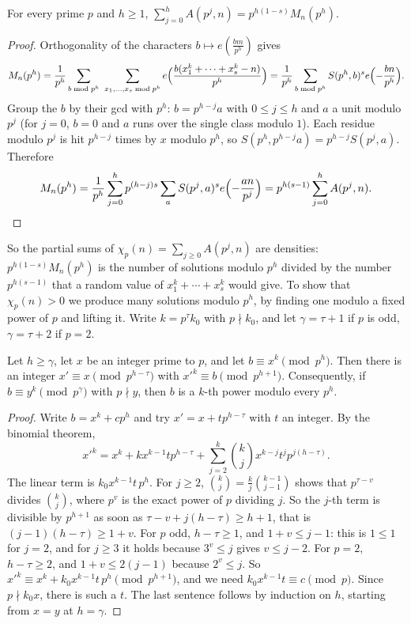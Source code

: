 \begin{lemma}\label{lem:localcount}
For every prime $p$ and $h\ge1$, $\displaystyle\sum_{j=0}^hA(p^j,n)=p^{h(1-s)}M_n(p^h)$.
\end{lemma}
\begin{proof}
Orthogonality of the characters $b\mapsto e(\frac{bm}{p^h})$ gives
\[
M_n(p^h)=\frac1{p^h}\sum_{b\bmod p^h}\ \sum_{x_1,\dots,x_s\bmod p^h}e\Bigl(\frac{b(x_1^k+\cdots+x_s^k-n)}{p^h}\Bigr)=\frac1{p^h}\sum_{b\bmod p^h}S(p^h,b)^se\Bigl(-\frac{bn}{p^h}\Bigr).
\]
Group the $b$ by their gcd with $p^h$: $b=p^{h-j}a$ with $0\le j\le h$ and $a$ a unit modulo $p^j$ (for $j=0$, $b=0$ and $a$ runs over the single class modulo $1$). Each residue modulo $p^j$ is hit $p^{h-j}$ times by $x$ modulo $p^h$, so $S(p^h,p^{h-j}a)=p^{h-j}S(p^j,a)$. Therefore
\[
M_n(p^h)=\frac1{p^h}\sum_{j=0}^hp^{(h-j)s}\sum_{a}S(p^j,a)^se\Bigl(-\frac{an}{p^j}\Bigr)=p^{h(s-1)}\sum_{j=0}^hA(p^j,n).\qedhere
\]
\end{proof}

So the partial sums of $\chi_p(n)=\sum_{j\ge0}A(p^j,n)$ are densities: $p^{h(1-s)}M_n(p^h)$ is the number of solutions modulo $p^h$ divided by the number $p^{h(s-1)}$ that a random value of $x_1^k+\cdots+x_s^k$ would give. To show that $\chi_p(n)>0$ we produce many solutions modulo $p^h$, by finding one modulo a fixed power of $p$ and lifting it. Write $k=p^\tau k_0$ with $p\nmid k_0$, and let $\gamma=\tau+1$ if $p$ is odd, $\gamma=\tau+2$ if $p=2$.

\begin{lemma}\label{lem:henselk}
Let $h\ge\gamma$, let $x$ be an integer prime to $p$, and let $b\equiv x^k\pmod{p^h}$. Then there is an integer $x'\equiv x\pmod{p^{h-\tau}}$ with $x'^k\equiv b\pmod{p^{h+1}}$. Consequently, if $b\equiv y^k\pmod{p^\gamma}$ with $p\nmid y$, then $b$ is a $k$-th power modulo every $p^h$.
\end{lemma}
\begin{proof}
Write $b=x^k+cp^h$ and try $x'=x+tp^{h-\tau}$ with $t$ an integer. By the binomial theorem,
\[
x'^k=x^k+kx^{k-1}tp^{h-\tau}+\sum_{j=2}^k\binom kjx^{k-j}t^jp^{j(h-\tau)}.
\]
The linear term is $k_0x^{k-1}t\,p^h$. For $j\ge2$, $\binom kj=\frac kj\binom{k-1}{j-1}$ shows that $p^{\tau-v}$ divides $\binom kj$, where $p^v$ is the exact power of $p$ dividing $j$. So the $j$-th term is divisible by $p^{h+1}$ as soon as $\tau-v+j(h-\tau)\ge h+1$, that is $(j-1)(h-\tau)\ge1+v$. For $p$ odd, $h-\tau\ge1$, and $1+v\le j-1$: this is $1\le1$ for $j=2$, and for $j\ge3$ it holds because $3^v\le j$ gives $v\le j-2$. For $p=2$, $h-\tau\ge2$, and $1+v\le2(j-1)$ because $2^v\le j$. So $x'^k\equiv x^k+k_0x^{k-1}t\,p^h\pmod{p^{h+1}}$, and we need $k_0x^{k-1}t\equiv c\pmod p$. Since $p\nmid k_0x$, there is such a $t$. The last sentence follows by induction on $h$, starting from $x=y$ at $h=\gamma$.
\end{proof}

